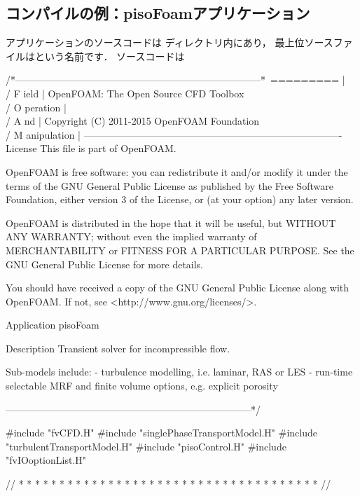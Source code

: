 \subsection{コンパイルの例：pisoFoamアプリケーション}
\label{ssec:3.2.4}
アプリケーションのソースコードは
ディレクトリ内にあり，
最上位ソースファイルはという名前です．
ソースコードは
\begin{OFverbatim}
/*---------------------------------------------------------------------------*\
  =========                 |
  \\      /  F ield         | OpenFOAM: The Open Source CFD Toolbox
   \\    /   O peration     |
    \\  /    A nd           | Copyright (C) 2011-2015 OpenFOAM Foundation
     \\/     M anipulation  |
-------------------------------------------------------------------------------
License
    This file is part of OpenFOAM.

    OpenFOAM is free software: you can redistribute it and/or modify it
    under the terms of the GNU General Public License as published by
    the Free Software Foundation, either version 3 of the License, or
    (at your option) any later version.

    OpenFOAM is distributed in the hope that it will be useful, but WITHOUT
    ANY WARRANTY; without even the implied warranty of MERCHANTABILITY or
    FITNESS FOR A PARTICULAR PURPOSE.  See the GNU General Public License
    for more details.

    You should have received a copy of the GNU General Public License
    along with OpenFOAM.  If not, see <http://www.gnu.org/licenses/>.

Application
    pisoFoam

Description
    Transient solver for incompressible flow.

    Sub-models include:
    - turbulence modelling, i.e. laminar, RAS or LES
    - run-time selectable MRF and finite volume options, e.g. explicit porosity

\*---------------------------------------------------------------------------*/

#include "fvCFD.H"
#include "singlePhaseTransportModel.H"
#include "turbulentTransportModel.H"
#include "pisoControl.H"
#include "fvIOoptionList.H"

// * * * * * * * * * * * * * * * * * * * * * * * * * * * * * * * * * * * * * //


\end{OFverbatim}
